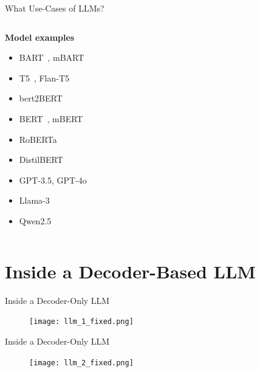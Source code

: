 \documentclass[11pt,aspectratio=169]{beamer}
\begin{document}
\begin{frame}{What Use-Cases of LLMs?}
\begin{columns}
        \begin{column}{0.35\linewidth}
            \begin{center}
            \textbf{Model examples}
            \end{center}
            \begin{itemize}
                \item BART~\cite{bart}, mBART~\cite{mbart}
                \item T5~\cite{t5}, Flan-T5~\cite{flan-t5}
                \item bert2BERT~\cite{bert2bert}
            \end{itemize}
            \vspace{0.3cm}
            \begin{itemize}
                \item BERT~\cite{bert}, mBERT~\cite{mbert}
                \item RoBERTa~\cite{roberta}
                \item DistilBERT~\cite{distilbert}
            \end{itemize}
            \vspace{0.3cm}
            \begin{itemize}
                \item GPT-3.5, GPT-4o
                \item Llama-3~\cite{llama3}
                \item Qwen2.5~\cite{qwen25technicalreport}
            \end{itemize}
        \end{column}
    \end{columns}
\end{frame}

\section{Inside a Decoder-Based LLM}

\begin{frame}{Inside a Decoder-Only LLM}
    \begin{figure}
        \centering
        \texttt{[image: llm\_1\_fixed.png]}
    \end{figure}
\end{frame}

\begin{frame}{Inside a Decoder-Only LLM}
    \begin{figure}
        \centering
        \texttt{[image: llm\_2\_fixed.png]}
    \end{figure}
\end{frame}
\end{document}

